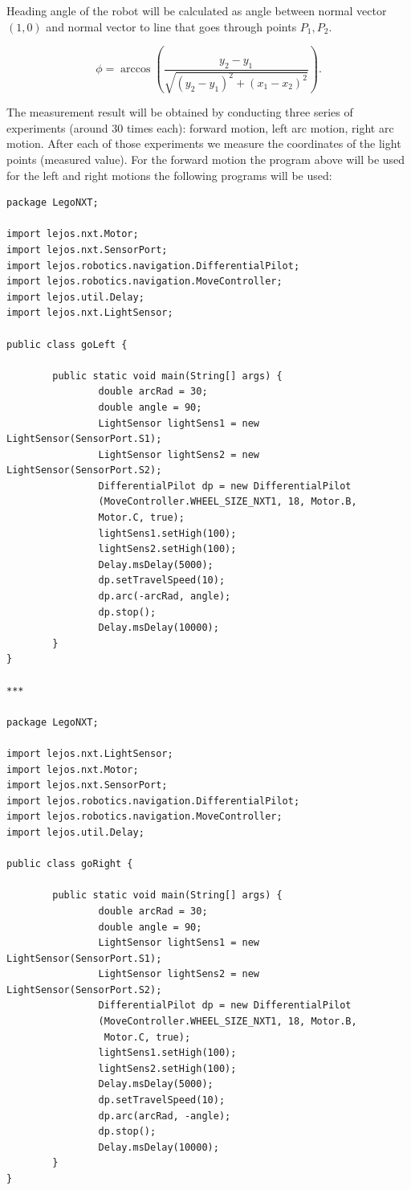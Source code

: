 \documentclass[a4paper, 12pt]{article}
\begin{document}
Heading angle of the robot will be calculated as angle between normal vector $(1,0)$ and normal vector to line that goes through points $P_1,P_2.$

\begin{equation}
\phi = \arccos(\frac{y_2-y_1}{\sqrt{(y_2-y_1)^2+(x_1-x_2)^2}}).
\end{equation}


 The measurement result will be obtained by conducting three series of experiments (around 30 times each): forward motion, left arc motion, right arc motion. After each of those experiments we measure the coordinates of the light points (measured value).  For the forward motion the program above will be used for the left and right motions the following programs will be used:

\begin{lstlisting}
package LegoNXT;

import lejos.nxt.Motor;
import lejos.nxt.SensorPort;
import lejos.robotics.navigation.DifferentialPilot;
import lejos.robotics.navigation.MoveController;
import lejos.util.Delay;
import lejos.nxt.LightSensor;

public class goLeft {

        public static void main(String[] args) {
                double arcRad = 30;
                double angle = 90;
                LightSensor lightSens1 = new LightSensor(SensorPort.S1);
                LightSensor lightSens2 = new LightSensor(SensorPort.S2);
                DifferentialPilot dp = new DifferentialPilot
                (MoveController.WHEEL_SIZE_NXT1, 18, Motor.B,
                Motor.C, true);
                lightSens1.setHigh(100);
                lightSens2.setHigh(100);
                Delay.msDelay(5000);
                dp.setTravelSpeed(10);
                dp.arc(-arcRad, angle);
                dp.stop();
                Delay.msDelay(10000);
        }
}

***

package LegoNXT;

import lejos.nxt.LightSensor;
import lejos.nxt.Motor;
import lejos.nxt.SensorPort;
import lejos.robotics.navigation.DifferentialPilot;
import lejos.robotics.navigation.MoveController;
import lejos.util.Delay;

public class goRight {

        public static void main(String[] args) {
                double arcRad = 30;
                double angle = 90;
                LightSensor lightSens1 = new LightSensor(SensorPort.S1);
                LightSensor lightSens2 = new LightSensor(SensorPort.S2);
                DifferentialPilot dp = new DifferentialPilot
                (MoveController.WHEEL_SIZE_NXT1, 18, Motor.B,
                 Motor.C, true);
                lightSens1.setHigh(100);
                lightSens2.setHigh(100);
                Delay.msDelay(5000);		
                dp.setTravelSpeed(10);
                dp.arc(arcRad, -angle);
                dp.stop();
                Delay.msDelay(10000);
        }
}

\end{lstlisting}
\end{document}
